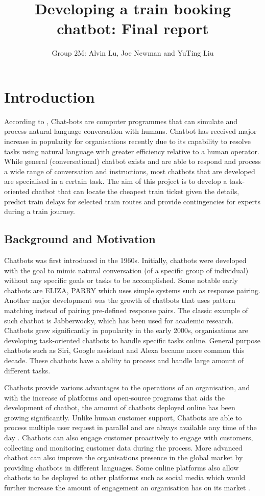 \documentclass[11pt]{article}
\title{Developing a train booking chatbot: Final report}
\author{Group 2M: Alvin Lu, Joe Newman and YuTing Liu}
\begin{document}
\maketitle

\section{Introduction}
According to \citet{Oracle}, Chat-bots are computer programmes that can simulate and process natural language conversation with humans. Chatbot has received major increase in popularity for organisations recently due to its capability to resolve tasks using natural language with greater efficiency relative to a human operator. While general (conversational) chatbot exists and are able to respond and process a wide range of conversation and instructions, most chatbots that are developed are specialised in a certain task. The aim of this project is to develop a task-oriented chatbot that can locate the cheapest train ticket given the details, predict train delays for selected train routes and provide contingencies for experts during a train journey.

\subsection{Background and Motivation}
Chatbots was first introduced in the 1960s. Initially, chatbots were developed with the goal to mimic natural conversation (of a specific group of individual) without any specific goals or tasks to be accomplished. Some notable early chatbots are ELIZA, PARRY which uses simple systems such as response pairing. Another major development was the growth of chatbots that uses pattern matching instead of pairing pre-defined response pairs. The classic example of such chatbot is Jabberwocky, which has been used for academic research. Chatbots grew significantly in popularity in the early 2000s, organisations are developing task-oriented chatbots to handle specific tasks online. General purpose chatbots such as Siri, Google assistant and Alexa became more common this decade. These chatbots have a ability to process and handle large amount of different tasks.

Chatbots provide various advantages to the operations of an organisation, and with the increase of platforms and open-source programs that aids the development of chatbot, the amount of chatbots deployed online has been growing significantly. Unlike human customer support, Chatbots are able to process multiple user request in parallel and are always available any time of the day \citep{ChatBotPros}. Chatbots can also engage customer proactively to engage with customers, collecting and monitoring customer data during the process. More advanced chatbot can also improve the organisations presence in the global market by providing chatbots in different languages. Some online platforms also allow chatbots to be deployed to other platforms such as social media which would further increase the amount of engagement an organisation has on its market \cite{ChatBotPros}.
\end{document}
